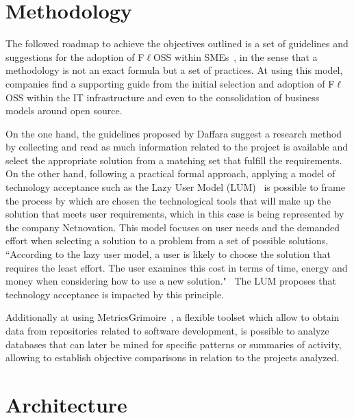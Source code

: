 \documentclass[a4paper, 12pt]{book}
\begin{document}
%
\chapter{Methodology}
\label{chap:methodology}

The followed roadmap to achieve the objectives outlined is a set of guidelines and suggestions for the adoption of F$\ell$OSS within SMEs~\cite{Daffara1}, in the sense that a methodology is not an exact formula but a set of practices. At using this model, companies find a supporting guide from the initial selection and adoption of F$\ell$OSS within the IT infrastructure and even to the consolidation of business models around open source.\bigskip

\noindent On the one hand, the guidelines proposed by Daffara suggest a research method by collecting and read as much information related to the project is available and select the appropriate solution from a matching set that fulfill the requirements. On the other hand, following a practical formal approach, applying a model of technology acceptance such as the Lazy User Model (LUM)~\cite{CandT1} is possible to frame the process by which are chosen the technological tools that will make up the solution that meets user requirements, which in this case is being represented by the company Netnovation. This model focuses on user needs and the demanded effort when selecting a solution to a problem from a set of possible solutions, ``According to the lazy user model, a user is likely to choose the solution that requires the least effort. The user examines this cost in terms of time, energy and money when considering how to use a new solution."~\cite{CandT2} The LUM proposes that technology acceptance is impacted 
by this principle.\bigskip

\noindent Additionally at using MetricsGrimoire~\cite{GSyC}, a flexible toolset which allow to obtain data from repositories related to software development, is possible to analyze databases that can later be mined for specific patterns or summaries of activity, allowing to establish objective comparisons in relation to the projects analyzed.


%
\chapter{Architecture}
\label{chap:architecture}
\end{document}
